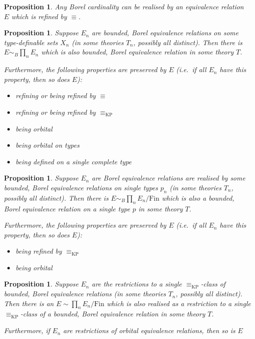 \documentclass[final,a4paper,12pt]{amsart}
\newcommand\KP{{\mathrm{KP}}}
\newcommand{\Fin}{\mathrm{Fin}}
\newtheorem{prop}[thm]{Proposition}
\theoremstyle{remark}
\theoremstyle{definition}
\begin{document}
	\begin{prop}
		Any Borel cardinality can be realised by an equivalence relation $E$ which is refined by $\equiv$.
	\end{prop}
	
	\begin{prop}
		Suppose $E_n$ are bounded,  Borel equivalence relations on some type-definable sets $X_n$ (in some theories $T_n$, possibly all distinct). Then there is $E\sim_B \prod_nE_n$ which is also bounded, Borel equivalence relation in some theory $T$.
		
		Furthermore, the following properties are preserved by $E$ (i.e.\, if all $E_n$ have this property, then so does $E$):
		\begin{itemize}
			\item
			refining or being refined by $\equiv$
			\item
			refining or being refined by $\equiv_{\KP}$
			\item
			being orbital
			\item
			being orbital on types
			\item
			being defined on a single complete type
		\end{itemize}
	\end{prop}
	
	\begin{prop}
		Suppose $E_n$ are Borel equivalence relations are realised by some bounded, Borel equivalence relations on single types $p_n$ (in some theories $T_n$, possibly all distinct). Then there is $E\sim_B\prod_nE_n/\Fin$ which is also a bounded, Borel equivalence relation on a single type $p$ in some theory $T$.
		
		Furthermore, the following properties are preserved by $E$ (i.e.\, if all $E_n$ have this property, then so does $E$):
		\begin{itemize}
			\item
			being refined by $\equiv_{\KP}$
			\item
			being orbital
		\end{itemize}
	\end{prop}
	
	\begin{prop}
		Suppose $E_n$ are the restrictions to a single ${\equiv_{\KP}}$-class of bounded, Borel equivalence relations (in some theories $T_n$, possibly all distinct). Then there is an $E\sim\prod_nE_n/\Fin$ which is also realised as a restriction to a single ${\equiv_{\KP}}$-class of a bounded, Borel equivalence relation in some theory $T$.
		
		Furthermore, if $E_n$ are restrictions of orbital equivalence relations, then so is $E$
	\end{prop}
	
\end{document}

